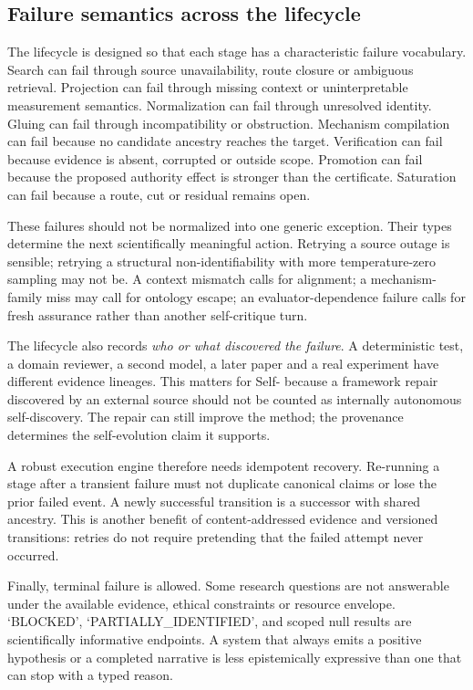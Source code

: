 \subsection{Failure semantics across the lifecycle}

The lifecycle is designed so that each stage has a characteristic failure vocabulary. Search can fail through source unavailability, route closure or ambiguous retrieval. Projection can fail through missing context or uninterpretable measurement semantics. Normalization can fail through unresolved identity. Gluing can fail through incompatibility or obstruction. Mechanism compilation can fail because no candidate ancestry reaches the target. Verification can fail because evidence is absent, corrupted or outside scope. Promotion can fail because the proposed authority effect is stronger than the certificate. Saturation can fail because a route, cut or residual remains open.

These failures should not be normalized into one generic exception. Their types determine the next scientifically meaningful action. Retrying a source outage is sensible; retrying a structural non-identifiability with more temperature-zero sampling may not be. A context mismatch calls for alignment; a mechanism-family miss may call for ontology escape; an evaluator-dependence failure calls for fresh assurance rather than another self-critique turn.

The lifecycle also records \emph{who or what discovered the failure}. A deterministic test, a domain reviewer, a second model, a later paper and a real experiment have different evidence lineages. This matters for Self-\RAKL{} because a framework repair discovered by an external source should not be counted as internally autonomous self-discovery. The repair can still improve the method; the provenance determines the self-evolution claim it supports.

A robust execution engine therefore needs idempotent recovery. Re-running a stage after a transient failure must not duplicate canonical claims or lose the prior failed event. A newly successful transition is a successor with shared ancestry. This is another benefit of content-addressed evidence and versioned transitions: retries do not require pretending that the failed attempt never occurred.

Finally, terminal failure is allowed. Some research questions are not answerable under the available evidence, ethical constraints or resource envelope. `BLOCKED', `PARTIALLY\_IDENTIFIED', \CannotCheck{} and scoped null results are scientifically informative endpoints. A system that always emits a positive hypothesis or a completed narrative is less epistemically expressive than one that can stop with a typed reason.
